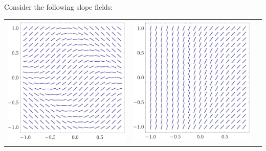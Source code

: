 \bookonlynewpage

\question Consider the following slope fields:


\setlength{\len}{150pt}
\begin{tabular}{ccc}
	\includegraphics*[height=\len]{images/module9-graph1}
		& \includegraphics*[height=\len]{images/module9-graph2}

\end{tabular}
